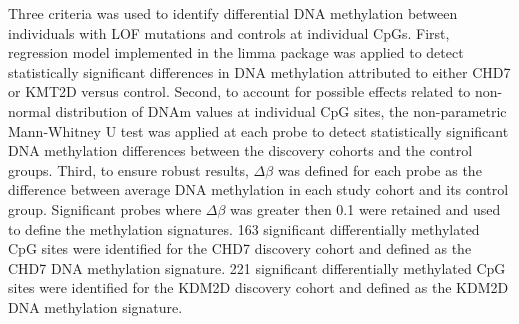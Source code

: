 Three criteria was used to identify differential DNA methylation between individuals with LOF mutations and controls at individual CpGs. First, regression model implemented in the limma package was applied to detect statistically significant differences in DNA methylation attributed to either CHD7 or KMT2D versus control. Second, to account for possible effects related to non-normal distribution of DNAm values at individual CpG sites, the non-parametric Mann-Whitney U test was applied at each probe to detect statistically significant DNA methylation differences between the discovery cohorts and the control groups. Third, to ensure robust results, $\Delta \beta$ was defined for each probe as the difference between average DNA methylation in each study cohort and its control group. Significant probes where $\Delta \beta$ was greater then 0.1 were retained and used to define the methylation signatures. 163 significant differentially methylated CpG sites were identified for the CHD7 discovery cohort and defined as the CHD7 DNA methylation signature. 221 significant differentially methylated CpG sites were identified for the KDM2D discovery cohort and defined as the KDM2D DNA methylation signature.

